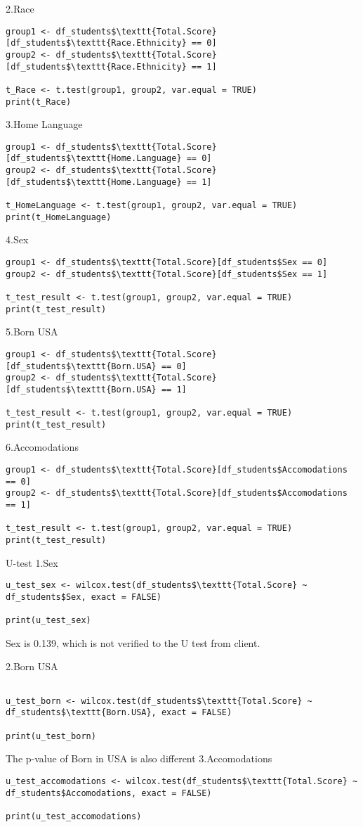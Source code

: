 2.Race
\begin{verbatim}
group1 <- df_students$\texttt{Total.Score}[df_students$\texttt{Race.Ethnicity} == 0]
group2 <- df_students$\texttt{Total.Score}[df_students$\texttt{Race.Ethnicity} == 1]

t_Race <- t.test(group1, group2, var.equal = TRUE)  
print(t_Race)
\end{verbatim}
3.Home Language
\begin{verbatim}
group1 <- df_students$\texttt{Total.Score}[df_students$\texttt{Home.Language} == 0]
group2 <- df_students$\texttt{Total.Score}[df_students$\texttt{Home.Language} == 1]

t_HomeLanguage <- t.test(group1, group2, var.equal = TRUE)  
print(t_HomeLanguage)
\end{verbatim}
4.Sex
\begin{verbatim}
group1 <- df_students$\texttt{Total.Score}[df_students$Sex == 0]
group2 <- df_students$\texttt{Total.Score}[df_students$Sex == 1]

t_test_result <- t.test(group1, group2, var.equal = TRUE)  
print(t_test_result)
\end{verbatim}

5.Born USA
\begin{verbatim}
group1 <- df_students$\texttt{Total.Score}[df_students$\texttt{Born.USA} == 0]
group2 <- df_students$\texttt{Total.Score}[df_students$\texttt{Born.USA} == 1]

t_test_result <- t.test(group1, group2, var.equal = TRUE)  
print(t_test_result)
\end{verbatim}


6.Accomodations
\begin{verbatim}
group1 <- df_students$\texttt{Total.Score}[df_students$Accomodations == 0]
group2 <- df_students$\texttt{Total.Score}[df_students$Accomodations == 1]

t_test_result <- t.test(group1, group2, var.equal = TRUE)  
print(t_test_result)
\end{verbatim}

U-test
1.Sex
\begin{verbatim}
u_test_sex <- wilcox.test(df_students$\texttt{Total.Score} ~ df_students$Sex, exact = FALSE)

print(u_test_sex)

\end{verbatim}
Sex is 0.139, which is not verified to the U test from client.

2.Born USA
\begin{verbatim}

u_test_born <- wilcox.test(df_students$\texttt{Total.Score} ~ df_students$\texttt{Born.USA}, exact = FALSE)

print(u_test_born)

\end{verbatim}
The p-value of Born in USA is also different 
3.Accomodations
\begin{verbatim}
u_test_accomodations <- wilcox.test(df_students$\texttt{Total.Score} ~ df_students$Accomodations, exact = FALSE)

print(u_test_accomodations)

\end{verbatim}


